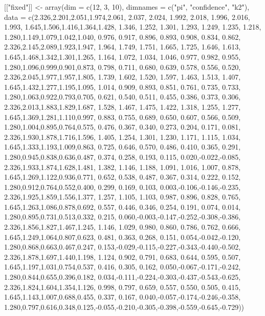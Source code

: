 \documentclass[10pt]{article}%
\begin{document}
[["fixed"]] <- array(dim = c(12, 3, 10), dimnames = c("pi", "confidence", "k2"), 
  data =
  c(2.326,2.201,2.051,1.974,2.061, 2.037, 2.024, 1.992, 2.018, 1.996, 2.016, 1.993,
    1.645,1.506,1.416,1.364,1.428, 1.346, 1.252, 1.301, 1.293, 1.249, 1.235, 1.218,
    1.280,1.149,1.079,1.042,1.040, 0.976, 0.917, 0.896, 0.893, 0.908, 0.834, 0.862,
    2.326,2.145,2.089,1.923,1.947, 1.964, 1.749, 1.751, 1.665, 1.725, 1.646, 1.613,
    1.645,1.468,1.342,1.301,1.265, 1.164, 1.072, 1.034, 1.046, 0.977, 0.982, 0.955,
    1.280,1.096,0.999,0.901,0.873, 0.798, 0.711, 0.680, 0.639, 0.578, 0.556, 0.520,
    2.326,2.045,1.977,1.957,1.805, 1.739, 1.602, 1.520, 1.597, 1.463, 1.513, 1.407,
    1.645,1.432,1.277,1.195,1.095, 1.014, 0.909, 0.893, 0.851, 0.761, 0.735, 0.733,
    1.280,1.063,0.922,0.793,0.705, 0.621, 0.540, 0.511, 0.455, 0.386, 0.373, 0.306,
    2.326,2.013,1.883,1.829,1.687, 1.528, 1.467, 1.475, 1.422, 1.318, 1.255, 1.277,
    1.645,1.369,1.281,1.110,0.997, 0.883, 0.755, 0.689, 0.650, 0.607, 0.566, 0.509,
    1.280,1.004,0.895,0.764,0.575, 0.476, 0.367, 0.340, 0.273, 0.204, 0.171, 0.081,
    2.326,1.930,1.878,1.716,1.596, 1.405, 1.254, 1.301, 1.230, 1.171, 1.115, 1.034,
    1.645,1.333,1.193,1.009,0.863, 0.725, 0.646, 0.570, 0.486, 0.410, 0.365, 0.291,
    1.280,0.945,0.838,0.636,0.487, 0.374, 0.258, 0.193, 0.115, 0.020,-0.022,-0.085,
    2.326,1.933,1.874,1.628,1.481, 1.382, 1.146, 1.188, 1.091, 1.016, 1.007, 0.878,
    1.645,1.269,1.122,0.936,0.771, 0.652, 0.538, 0.487, 0.367, 0.314, 0.222, 0.152,
    1.280,0.912,0.764,0.552,0.400, 0.299, 0.169, 0.103, 0.003,-0.106,-0.146,-0.235,
    2.326,1.925,1.859,1.556,1.377, 1.257, 1.105, 1.103, 0.987, 0.896, 0.828, 0.765,
    1.645,1.263,1.086,0.878,0.692, 0.557, 0.446, 0.346, 0.254, 0.191, 0.074, 0.014,
    1.280,0.895,0.731,0.513,0.332, 0.215, 0.060,-0.003,-0.147,-0.252,-0.308,-0.386,
    2.326,1.856,1.827,1.467,1.245, 1.146, 1.029, 0.980, 0.860, 0.786, 0.762, 0.666,
    1.645,1.249,1.064,0.807,0.623, 0.481, 0.363, 0.268, 0.151, 0.054,-0.042,-0.120,
    1.280,0.868,0.663,0.467,0.247, 0.153,-0.029,-0.115,-0.227,-0.343,-0.440,-0.502,
    2.326,1.878,1.697,1.440,1.198, 1.124, 0.902, 0.791, 0.683, 0.644, 0.595, 0.507,
    1.645,1.197,1.031,0.754,0.537, 0.416, 0.305, 0.162, 0.050,-0.067,-0.171,-0.242,
    1.280,0.844,0.655,0.396,0.182, 0.034,-0.111,-0.224,-0.303,-0.437,-0.543,-0.625,
    2.326,1.824,1.604,1.354,1.126, 0.998, 0.797, 0.659, 0.557, 0.550, 0.505, 0.415,
    1.645,1.143,1.007,0.688,0.455, 0.337, 0.167, 0.040,-0.057,-0.174,-0.246,-0.358,
    1.280,0.797,0.616,0.348,0.125,-0.055,-0.210,-0.305,-0.398,-0.559,-0.645,-0.729))
\eatline
{}\nwendcode{}\nwdocspar
\end{document}
